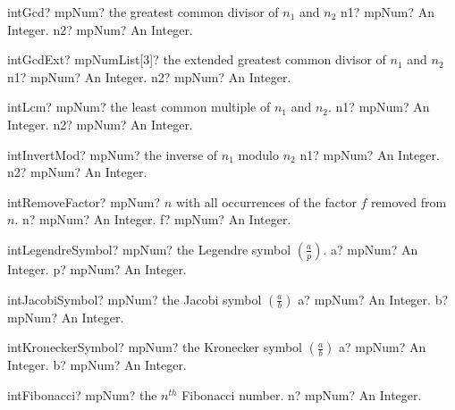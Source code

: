 \documentclass[12pt,a4paper,openany]{book}
\begin{document}
\begin{mpFunctionsExtract}
\mpFunctionTwo
{intGcd? mpNum? the greatest common divisor of $n_1$ and $n_2$}
{n1? mpNum? An Integer.}
{n2? mpNum? An Integer.}
\end{mpFunctionsExtract}

\begin{mpFunctionsExtract}
\mpFunctionTwo
{intGcdExt? mpNumList[3]? the extended greatest common divisor of $n_1$ and $n_2$}
{n1? mpNum? An Integer.}
{n2? mpNum? An Integer.}
\end{mpFunctionsExtract}

\begin{mpFunctionsExtract}
\mpFunctionTwo
{intLcm? mpNum? the least common multiple of $n_1$ and $n_2$.}
{n1? mpNum? An Integer.}
{n2? mpNum? An Integer.}
\end{mpFunctionsExtract}

\begin{mpFunctionsExtract}
\mpFunctionTwo
{intInvertMod? mpNum? the inverse of $n_1$ modulo $n_2$}
{n1? mpNum? An Integer.}
{n2? mpNum? An Integer.}
\end{mpFunctionsExtract}

\begin{mpFunctionsExtract}
\mpFunctionTwo
{intRemoveFactor? mpNum? $n$ with all occurrences of the factor $f$ removed from $n$.}
{n? mpNum? An Integer.}
{f? mpNum? An Integer.}
\end{mpFunctionsExtract}

\begin{mpFunctionsExtract}
\mpFunctionTwo
{intLegendreSymbol? mpNum? the Legendre symbol $\left(\frac{a}{p}\right)$.}
{a? mpNum? An Integer.}
{p? mpNum? An Integer.}
\end{mpFunctionsExtract}

\begin{mpFunctionsExtract}
\mpFunctionTwo
{intJacobiSymbol? mpNum? the Jacobi symbol $\left(\frac{a}{b}\right)$}
{a? mpNum? An Integer.}
{b? mpNum? An Integer.}
\end{mpFunctionsExtract}

\begin{mpFunctionsExtract}
\mpFunctionTwo
{intKroneckerSymbol? mpNum? the Kronecker symbol $\left(\frac{a}{b}\right)$}
{a? mpNum? An Integer.}
{b? mpNum? An Integer.}
\end{mpFunctionsExtract}

\begin{mpFunctionsExtract}
\mpFunctionOne
{intFibonacci? mpNum? the $n^{th}$ Fibonacci number.}
{n? mpNum? An Integer.}
\end{mpFunctionsExtract}
\end{document}
